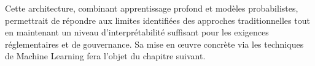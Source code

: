 Cette architecture, combinant apprentissage profond et modèles probabilistes, permettrait de répondre aux limites identifiées des approches traditionnelles tout en maintenant un niveau d'interprétabilité suffisant pour les exigences réglementaires et de gouvernance. Sa mise en œuvre concrète via les techniques de Machine Learning fera l'objet du chapitre suivant.
